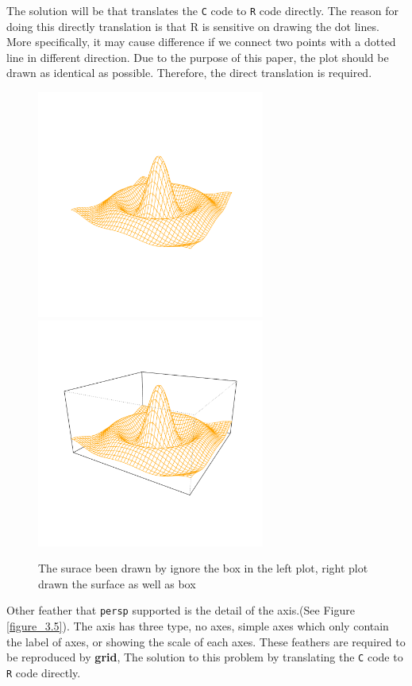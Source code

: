 \documentclass[paper=a4, fontsize=11pt]{report}
\begin{document}
The solution will be that translates the \texttt{C} code to \texttt{R} code directly. The reason for doing this directly translation is that R is sensitive on drawing the dot lines. More specifically, it may cause difference if we connect two points with a dotted line in different direction. Due to the purpose of this paper, the plot should be drawn as identical as possible. Therefore, the direct translation is required.\\


\begin{figure}[h]
	\begin{center}
		\includegraphics[height = 7.5cm, width = 7.5cm]{figure/box_example_1.pdf}
		\includegraphics[height = 7.5cm, width = 7.5cm]{figure/box_example_2.pdf}
		\caption{The surace been drawn by ignore the box in the left plot, right plot drawn the surface as well as box}
		\label{figure_3.4}
	\end{center}
\end{figure}

Other feather that \texttt{persp} supported is the detail of the axis.(See Figure \ref{figure_3.5}). The axis has three type, no axes, simple axes which only contain the label of axes, or showing the scale of each axes. These feathers are required to be reproduced by \textbf{grid}, The solution to this problem by translating the \texttt{C} code to \texttt{R} code directly.
\end{document}

